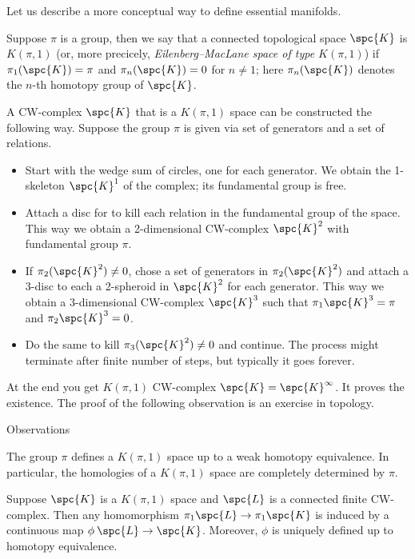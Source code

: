 Let us describe a more conceptual way to define essential manifolds.

Suppose $\pi$ is a group,
then we say that a connected topological space $\spc{K}$ is \emph{$K(\pi,1)$} (or, more precicely, \emph{Eilenberg--MacLane space of type $K(\pi,1)$})
if $\pi_1(\spc{K})=\pi$ and $\pi_n(\spc{K})=0$ for $n\ne 1$;
here $\pi_n(\spc{K})$ denotes the $n$-th homotopy group of $\spc{K}$.

A CW-complex $\spc{K}$ that is a $K(\pi,1)$ space can be constructed the following way.
Suppose the group $\pi$ is given via set of generators and a set of relations. 
\begin{itemize}
\item Start with the wedge sum of circles, one for each generator.
We obtain the 1-skeleton $\spc{K}^1$ of the complex; its fundamental group is free.

\item Attach a disc for to kill each relation in the fundamental group of the space.
This way we obtain a 2-dimensional CW-complex $\spc{K}^2$ with fundamental group $\pi$.

\item If $\pi_2(\spc{K}^2)\ne0$, chose a set of generators in $\pi_2(\spc{K}^2)$ and attach a $3$-disc to each a 2-spheroid in $\spc{K}^2$ for each generator.
This way we obtain a 3-dimensional CW-complex $\spc{K}^3$ such that  $\pi_1\spc{K}^3=\pi$ and $\pi_2\spc{K}^3=0$.


\item Do the same to kill $\pi_3(\spc{K}^2)\ne0$ and continue.
The process might terminate after finite number of steps, but typically it goes forever.
\end{itemize}
At the end you get $K(\pi,1)$ CW-complex  $\spc{K}=\spc{K}^\infty$.
It proves the existence.
The proof of the following observation is an exercise in topology.

\begin{thm}{Observations}

\begin{subthm}{}
The group $\pi$ defines a $K(\pi,1)$ space up to a weak homotopy equivalence.
In particular, the homologies of a $K(\pi,1)$ space are completely determined by $\pi$.
\end{subthm}


\begin{subthm}{}
Suppose $\spc{K}$ is a $K(\pi,1)$ space and $\spc{L}$ is a connected finite CW-complex.
Then any homomorphism $\pi_1\spc{L}\to\pi_1\spc{K}$ is induced by a continuous map $\phi\:\spc{L}\to\spc{K}$.
Moreover, $\phi$ is uniquely defined up to homotopy equivalence.
\end{subthm}

\end{thm}

